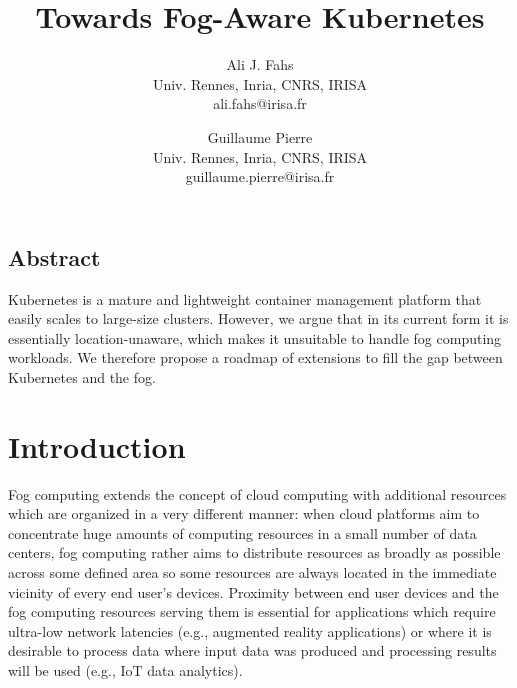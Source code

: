 \documentclass[letterpaper,twocolumn,10pt]{article}
\begin{document}
\date{}
\title{Towards Fog-Aware Kubernetes}
\author{
{\rm Ali J. Fahs}\\
Univ. Rennes, Inria, CNRS, IRISA\\
ali.fahs@irisa.fr
\and
{\rm Guillaume Pierre}\\
Univ. Rennes, Inria, CNRS, IRISA\\
guillaume.pierre@irisa.fr
}
\maketitle
\thispagestyle{empty}


\subsection*{Abstract}

Kubernetes is a mature and lightweight container management platform
that easily scales to large-size clusters. However, we argue that in
its current form it is essentially location-unaware, which makes it
unsuitable to handle fog computing workloads. We therefore propose a
roadmap of extensions to fill the gap between Kubernetes and the fog.

\section{Introduction}

Fog computing extends the concept of cloud computing with additional
resources which are organized in a very different manner: when cloud
platforms aim to concentrate huge amounts of computing resources in a
small number of data centers, fog computing rather aims to distribute
resources as broadly as possible across some defined area so some
resources are always located in the immediate vicinity of every end
user's devices. Proximity between end user devices and the fog
computing resources serving them is essential for applications which
require ultra-low network latencies (e.g., augmented reality
applications) or where it is desirable to process data where input
data was produced and processing results will be used (e.g., IoT data
analytics).


\end{document}
